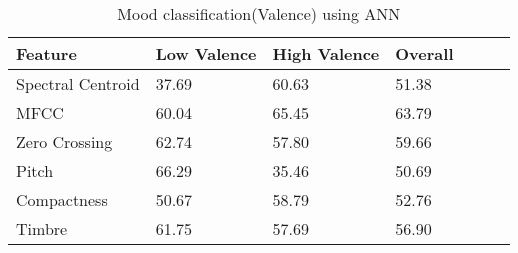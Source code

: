 \vspace{30mm}
\begin{table}[h!]
        \caption{Mood classification(Valence) using ANN}
        \begin{center}
                \begin{tabular}{|l|l|l|l|l|l|l|}
                        \hline
                        
                        Feature
                        &
                        Low Valence
                        &
                        High Valence
                        &
                        Overall\\\hline

                        Spectral Centroid
                        &
                        37.69
                        &
                        60.63
                        &
                        51.38
                        \\\hline

                        MFCC
                        &
                        60.04
                        &
                        65.45
                        &
                        63.79
                        \\\hline

                        Zero Crossing
                        &
                        62.74
                        &
                        57.80
                        &
                        59.66
                        \\\hline

                        Pitch
                        &
                        66.29
                        &
                        35.46
                        &
                        50.69
                        \\\hline

                        Compactness
                        & 
                        50.67
                        &
                        58.79
                        &
                        52.76
                        \\\hline

                        Timbre
                        &
                        61.75
                        &
                        57.69
                        &
                        56.90
                        \\\hline


\end{tabular}
\end{center}
\end{table}
